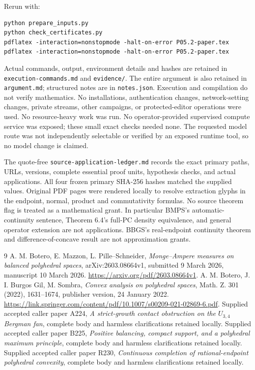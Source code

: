 \documentclass[11pt]{article}
\begin{document}
Rerun with:
\begin{verbatim}
python prepare_inputs.py
python check_certificates.py
pdflatex -interaction=nonstopmode -halt-on-error P05.2-paper.tex
pdflatex -interaction=nonstopmode -halt-on-error P05.2-paper.tex
\end{verbatim}
Actual commands, output, environment details and hashes are retained
in \texttt{execution-commands.md} and \texttt{evidence/}.
The entire argument is also retained in \texttt{argument.md};
structured notes are in \texttt{notes.json}. Execution and compilation
do not verify mathematics.
No installations, authentication changes, network-setting changes,
private streams, other campaigns, or protected-editor operations were
used. No resource-heavy work was run. No operator-provided supervised
compute service was exposed; these small exact checks needed none.
The requested model route was not independently selectable or verified
by an exposed runtime tool, so no model change is claimed.

The quote-free \texttt{source-application-ledger.md} records the exact
primary paths, URLs, versions, complete essential proof units, hypothesis
checks, and actual applications. All four frozen primary SHA-256 hashes
matched the supplied values. Original PDF pages were rendered locally
to resolve extraction glyphs in the endpoint, normal, product and
commutativity formulas. No source theorem flag is treated as a
mathematical grant. In particular BMPS's automatic-continuity sentence,
Theorem 6.4's full-PC density equivalence, and general operator extension
are not applications. BBGS's real-endpoint continuity theorem and
difference-of-concave result are not approximation grants.

\begin{thebibliography}{9}
 A. M. Botero, E. Mazzon, L. Pille--Schneider,
\emph{Monge--Ampere measures on balanced polyhedral spaces},
arXiv:2603.08664v1, submitted 9 March 2026, manuscript 10 March 2026.
\url{https://arxiv.org/pdf/2603.08664v1}.
 A. M. Botero, J. I. Burgos Gil, M. Sombra,
\emph{Convex analysis on polyhedral spaces}, Math. Z. 301 (2022),
1631--1674, publisher version, 24 January 2022.
\url{https://link.springer.com/content/pdf/10.1007/s00209-021-02869-6.pdf}.
 Supplied accepted caller paper A224,
\emph{A strict-growth contact obstruction on the \(U_{3,4}\) Bergman fan},
complete body and harmless clarifications retained locally.
 Supplied accepted caller paper B225,
\emph{Positive balancing, compact support, and a polyhedral maximum
principle}, complete body and harmless clarifications retained locally.
 Supplied accepted caller paper R230,
\emph{Continuous completion of rational-endpoint polyhedral convexity},
complete body and harmless clarifications retained locally.
\end{thebibliography}
\end{document}
